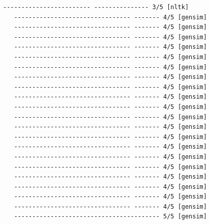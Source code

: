 \documentclass[11pt]{article}
\begin{document}
\begin{Verbatim}[commandchars=\\\{\}]
   ------------------------ --------------- 3/5 [nltk]
   -------------------------------- ------- 4/5 [gensim]
   -------------------------------- ------- 4/5 [gensim]
   -------------------------------- ------- 4/5 [gensim]
   -------------------------------- ------- 4/5 [gensim]
   -------------------------------- ------- 4/5 [gensim]
   -------------------------------- ------- 4/5 [gensim]
   -------------------------------- ------- 4/5 [gensim]
   -------------------------------- ------- 4/5 [gensim]
   -------------------------------- ------- 4/5 [gensim]
   -------------------------------- ------- 4/5 [gensim]
   -------------------------------- ------- 4/5 [gensim]
   -------------------------------- ------- 4/5 [gensim]
   -------------------------------- ------- 4/5 [gensim]
   -------------------------------- ------- 4/5 [gensim]
   -------------------------------- ------- 4/5 [gensim]
   -------------------------------- ------- 4/5 [gensim]
   -------------------------------- ------- 4/5 [gensim]
   -------------------------------- ------- 4/5 [gensim]
   -------------------------------- ------- 4/5 [gensim]
   -------------------------------- ------- 4/5 [gensim]
   ---------------------------------------- 5/5 [gensim]


\end{Verbatim}
\end{document}
